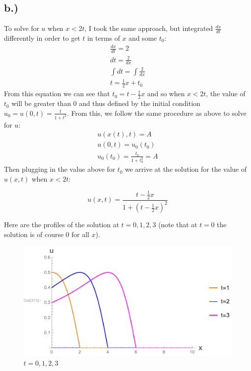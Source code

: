\documentclass{article}
\begin{document}
\subsection*{b.)}
To solve for $u$ when $x < 2t$, I took the same approach, but integrated $\frac{dx}{dt}$ differently in order to get $t$ in terms of $x$ and some $t_0$:
\begin{equation}
\begin{aligned}
\frac{dx}{dt} = 2\\
dt = \frac{2}{dx}\\
\int dt = \int \frac{2}{dx}\\
t = \frac{1}{2}x + t_0
\end{aligned}
\end{equation}
From this equation we can see that $t_0 = t - \frac{1}{2}x$ and so when $x < 2t$, the value of $t_0$ will be greater than $0$ and thus defined by the initial condition $u_0 = u(0,t) = \frac{t}{1+t^2}$. From this, we follow the same procedure as above to solve for $u$:
\begin{equation}
\begin{aligned}
u(x(t), t) = A\\
u(0, t) = u_0(t_0)\\
u_0(t_0) = \frac{t_0}{1+t_0^2} = A
\end{aligned}
\end{equation}
Then plugging in the value above for $t_0$ we arrive at the solution for the value of $u(x, t)$ when $x < 2t$:
\begin{tcolorbox}[minipage,colback=white,arc=0pt,outer arc=0pt]
\begin{equation}
u(x, t) =  \frac{t - \frac{1}{2}x}{1+(t - \frac{1}{2}x)^2}
\end{equation}
\end{tcolorbox}
Here are the profiles of the solution at $t = 0, 1, 2, 3$ (note that at $t=0$ the solution is of course 0 for all $x$).
\begin{figure}[H]
  \centering
    \includegraphics[width=\textwidth]{hw_12_plot2.pdf}
    \caption{$t = 0, 1, 2, 3$}
\end{figure}
\end{document}
